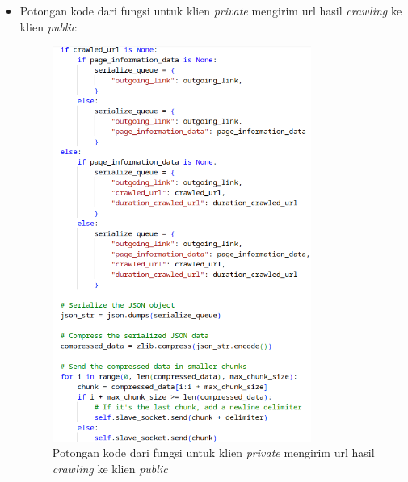 \begin{itemize}
	\clearpage
	\item{Potongan kode dari fungsi untuk klien \emph{private} mengirim url hasil \emph{crawling} ke klien \emph{public}}
	\begin{figure}[H]
		\centering{}
		\includegraphics[width=0.8\textwidth]{gambar/kode/potongan_client_13}
		\caption{Potongan kode dari fungsi untuk klien \emph{private} mengirim url hasil \emph{crawling} ke klien \emph{public}}
	\end{figure}


\end{itemize}
